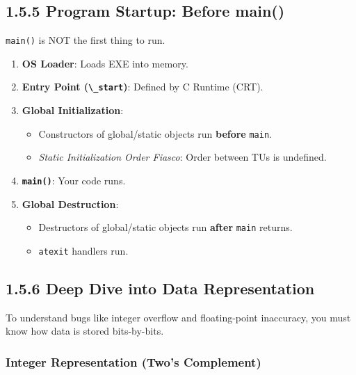 \hypertarget{program-startup-before-main}{%
\subsection{1.5.5 Program Startup: Before
main()}\label{program-startup-before-main}}

\passthrough{\lstinline!main()!} is NOT the first thing to run.

\begin{enumerate}
\def\labelenumi{\arabic{enumi}.}
\tightlist
\item
  \textbf{OS Loader}: Loads EXE into memory.
\item
  \textbf{Entry Point (\passthrough{\lstinline!\_start!})}: Defined by C
  Runtime (CRT).
\item
  \textbf{Global Initialization}:

  \begin{itemize}
  \tightlist
  \item
    Constructors of global/static objects run \textbf{before}
    \passthrough{\lstinline!main!}.
  \item
    \emph{Static Initialization Order Fiasco}: Order between TUs is
    undefined.
  \end{itemize}
\item
  \textbf{\passthrough{\lstinline!main()!}}: Your code runs.
\item
  \textbf{Global Destruction}:

  \begin{itemize}
  \tightlist
  \item
    Destructors of global/static objects run \textbf{after}
    \passthrough{\lstinline!main!} returns.
  \item
    \passthrough{\lstinline!atexit!} handlers run.
  \end{itemize}
\end{enumerate}

\hypertarget{deep-dive-into-data-representation}{%
\subsection{1.5.6 Deep Dive into Data
Representation}\label{deep-dive-into-data-representation}}

To understand bugs like integer overflow and floating-point inaccuracy,
you must know how data is stored bits-by-bits.

\hypertarget{integer-representation-twos-complement}{%
\subsubsection{Integer Representation (Two's
Complement)}\label{integer-representation-twos-complement}}

